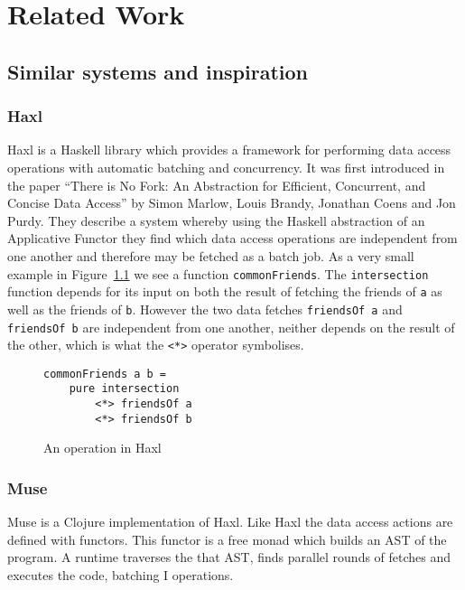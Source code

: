 \chapter{Related Work}

\label{ch:related-work}

\section{Similar systems and inspiration}

\subsection{Haxl}

Haxl\cite{Haxl:library:link} is a Haskell library which provides a framework for performing data access operations with automatic batching and concurrency. It was first introduced in the paper ``There is No Fork: An Abstraction for Efficient, Concurrent, and Concise Data Access''\cite{Marlow:2014:NFA:2692915.2628144} by Simon Marlow, Louis Brandy, Jonathan Coens and Jon Purdy.
They describe a system whereby using the Haskell abstraction of an Applicative Functor\cite{mcbride2008applicative} they find which data access operations are independent from one another and therefore may be fetched as a batch job.
As a very small example in Figure~\ref{fig:operation-in-haxl} we see a function \texttt{commonFriends}.
The \texttt{intersection} function depends for its input on both the result of fetching the friends of \texttt{a} as well as the friends of \texttt{b}.
However the two data fetches \texttt{friendsOf a} and \texttt{friendsOf b} are independent from one another, neither depends on the result of the other, which is what the \texttt{<*>} operator symbolises.

\begin{figure}
\begin{verbatim}
commonFriends a b =
    pure intersection
        <*> friendsOf a
        <*> friendsOf b
\end{verbatim}
\caption{An operation in Haxl}
\label{fig:operation-in-haxl}
\end{figure}

\subsection{Muse}

Muse\cite{Muse:repository:link} is a Clojure implementation of Haxl.
Like Haxl the data access actions are defined with functors.
This functor is a free monad which builds an AST of the program.
A runtime traverses the that AST, finds parallel rounds of fetches and executes the code, batching I operations.

